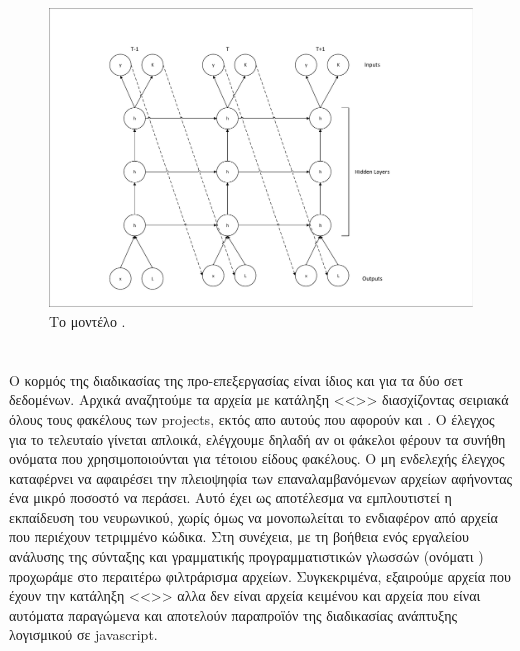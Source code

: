 \begin{figure}[h]
	\includegraphics[width=\textwidth, trim = 4 4 4 4, clip, keepaspectratio]{images/l-char-rnn.pdf}
	\centering 
	\caption{Το μοντέλο .}
	\label{fig:l-char-rnn}
\end{figure}

\section{}

Ο κορμός της διαδικασίας της προ-επεξεργασίας είναι ίδιος και για τα δύο σετ δεδομένων. 
Αρχικά αναζητούμε τα αρχεία με κατάληξη <<>> διασχίζοντας σειριακά όλους τους φακέλους των projects, εκτός απο αυτούς που αφορούν  και .
Ο έλεγχος για το τελευταίο γίνεται απλοικά, ελέγχουμε δηλαδή αν οι φάκελοι φέρουν τα συνήθη ονόματα που χρησιμοποιούνται για τέτοιου είδους φακέλους.
Ο μη ενδελεχής έλεγχος καταφέρνει να αφαιρέσει την πλειοψηφία των επαναλαμβανόμενων αρχείων αφήνοντας ένα μικρό ποσοστό να περάσει.
Αυτό έχει ως αποτέλεσμα να εμπλουτιστεί η εκπαίδευση του νευρωνικού, χωρίς όμως να μονοπωλείται το ενδιαφέρον από αρχεία που περιέχουν τετριμμένο κώδικα.
Στη συνέχεια, με τη βοήθεια ενός εργαλείου ανάλυσης της σύνταξης και γραμματικής προγραμματιστικών γλωσσών (ονόματι ) προχωράμε στο περαιτέρω φιλτράρισμα αρχείων.
Συγκεκριμένα, εξαιρούμε αρχεία που έχουν την κατάληξη <<>> αλλα δεν είναι αρχεία κειμένου και αρχεία που είναι αυτόματα παραγώμενα και αποτελούν παραπροϊόν της διαδικασίας ανάπτυξης λογισμικού σε javascript.

